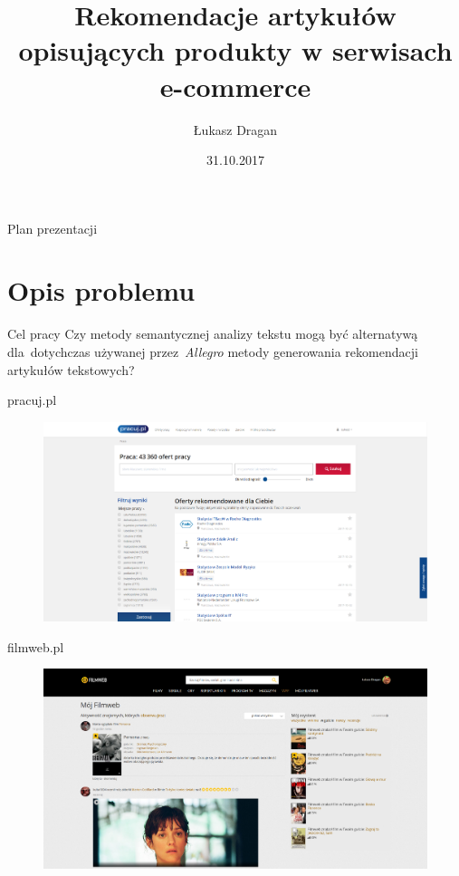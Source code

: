 \documentclass{beamer}
\title[Praca magisterska]{Rekomendacje artykułów opisujących produkty w serwisach e-commerce}
\author{Łukasz Dragan}
\institute{Informatyka spec. Metody sztucznej inteligencji, MiNI PW}
\date{31.10.2017}
\begin{document}
	
	\begin{frame}
		\titlepage
	\end{frame}
	
	\begin{frame}{Plan prezentacji}
	  \tableofcontents
	\end{frame}
	
	\section{Opis problemu}
	
	\begin{frame}{Cel pracy}
		Czy metody semantycznej analizy tekstu mogą być alternatywą dla~dotychczas używanej przez~\emph{Allegro} metody generowania rekomendacji artykułów tekstowych?
	\end{frame}
	
	\begin{frame}{pracuj.pl}
		\begin{figure}
			\centering
			\includegraphics[width=1\textwidth]{img/pracuj.png}
		\end{figure}
	\end{frame}
	
	\begin{frame}{filmweb.pl}
		\begin{figure}
			\centering
			\includegraphics[width=1\textwidth]{img/filmweb.png}
		\end{figure}
	\end{frame}
	
\end{document}

